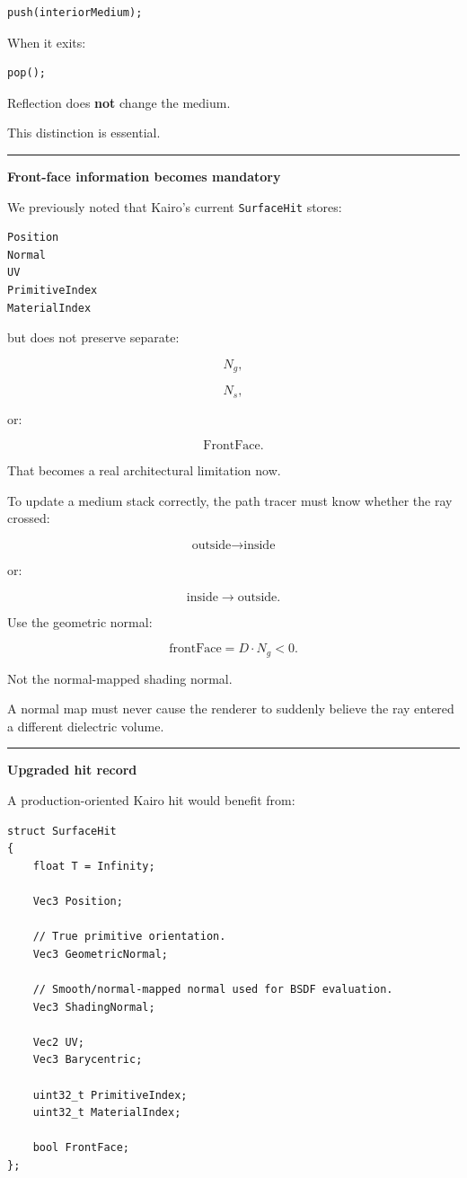 \begin{verbatim}
push(interiorMedium);
\end{verbatim}

When it exits:

\begin{verbatim}
pop();
\end{verbatim}

Reflection does \textbf{not} change the medium.

This distinction is essential.

\begin{center}\rule{0.5\linewidth}{0.5pt}\end{center}

\textbf{Front-face information becomes mandatory}

We previously noted that Kairo's current \texttt{SurfaceHit} stores:

\begin{verbatim}
Position
Normal
UV
PrimitiveIndex
MaterialIndex
\end{verbatim}

but does not preserve separate:

\[
N_g,
\]

\[
N_s,
\]

or:

\[
\text{FrontFace}.
\]

That becomes a real architectural limitation now.

To update a medium stack correctly, the path tracer must know whether the ray crossed:

\[
\text{outside}\rightarrow\text{inside}
\]

or:

\[
\text{inside}\rightarrow\text{outside}.
\]

Use the geometric normal:

\[
\boxed{
\text{frontFace}
=
D\cdot N_g<0.
}
\]

Not the normal-mapped shading normal.

A normal map must never cause the renderer to suddenly believe the ray entered a different dielectric volume.

\begin{center}\rule{0.5\linewidth}{0.5pt}\end{center}

\textbf{Upgraded hit record}

A production-oriented Kairo hit would benefit from:

\begin{verbatim}
struct SurfaceHit
{
    float T = Infinity;

    Vec3 Position;

    // True primitive orientation.
    Vec3 GeometricNormal;

    // Smooth/normal-mapped normal used for BSDF evaluation.
    Vec3 ShadingNormal;

    Vec2 UV;
    Vec3 Barycentric;

    uint32_t PrimitiveIndex;
    uint32_t MaterialIndex;

    bool FrontFace;
};
\end{verbatim}


